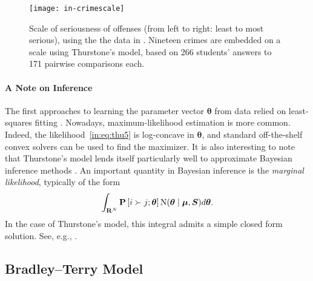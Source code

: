 \begin{figure}[ht]
\centering
\texttt{[image: in-crimescale]}
\caption{
Scale of seriousness of offenses (from left to right: least to most serious), using the the data in \citet{thurstone1927method}.
Nineteen crimes are embedded on a scale using Thurstone's model, based on 266 students' answers to 171 pairwise comparisons each.
}
\label{in:fig:crimescale}
\end{figure}


\paragraph{A Note on Inference}
The first approaches to learning the parameter vector $\bm{\theta}$ from data relied on least-squares fitting \citep{thurstone1927method, mosteller1951remarks}.
Nowadays, maximum-likelihood estimation is more common.
Indeed, the likelihood~\eqref{in:eq:thu5} is log-concave in $\bm{\theta}$, and standard off-the-shelf convex solvers can be used to find the maximizer.
It is also interesting to note that Thurstone's model lends itself particularly well to approximate Bayesian inference methods \citep{chu2005extensions, chu2005preference}.
An important quantity in Bayesian inference is the \emph{marginal likelihood}, typically of the form
\begin{align*}
\int_{\mathbf{R}^N} \mathbf{P}\left[ i \succ j ; \bm{\theta} \right] \mathrm{N}( \bm{\theta} \mid \bm{\mu}, \bm{S} ) d\bm{\theta}.
\end{align*}
In the case of Thurstone's model, this integral admits a simple closed form solution. See, e.g., \citet[Section~3.9]{rasmussen2006gaussian}.


\subsection{Bradley--Terry Model}

